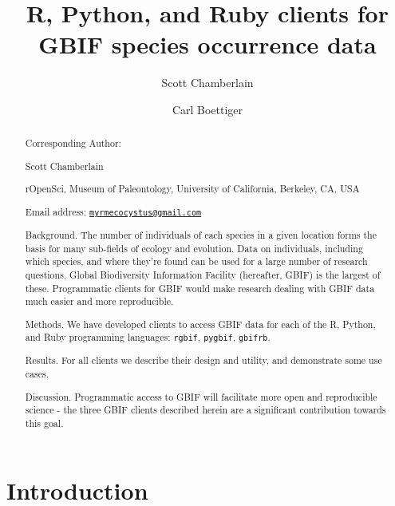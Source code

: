 \documentclass[3p]{elsarticle} %
\begin{document}
\begin{frontmatter}

  \title{R, Python, and Ruby clients for GBIF species occurrence data}
    \author[cstar]{Scott Chamberlain}
    \author[boettig]{Carl Boettiger}
      \address[cstar]{rOpenSci, Museum of Paleontology, University of
California, Berkeley, CA, USA}
    \address[boettig]{rOpenSci, Department of Enivornmental Science,
Policy and Management, University of California, Berkeley, CA, USA}
    
  \begin{abstract}
  Corresponding Author:

  Scott Chamberlain

  rOpenSci, Museum of Paleontology, University of California, Berkeley,
  CA, USA

  Email address:
  \href{mailto:myrmecocystus@gmail.com}{\nolinkurl{myrmecocystus@gmail.com}}

  \newpage

  Background. The number of individuals of each species in a given
  location forms the basis for many sub-fields of ecology and evolution.
  Data on individuals, including which species, and where they're found
  can be used for a large number of research questions. Global
  Biodiversity Information Facility (hereafter, GBIF) is the largest of
  these. Programmatic clients for GBIF would make research dealing with
  GBIF data much easier and more reproducible.

  Methods. We have developed clients to access GBIF data for each of the
  R, Python, and Ruby programming languages: \texttt{rgbif},
  \texttt{pygbif}, \texttt{gbifrb}.

  Results. For all clients we describe their design and utility, and
  demonstrate some use cases.

  Discussion. Programmatic access to GBIF will facilitate more open and
  reproducible science - the three GBIF clients described herein are a
  significant contribution towards this goal.
  \end{abstract}
  
 \end{frontmatter}

\newpage

\hypertarget{introduction}{%
\section{Introduction}\label{introduction}}
\end{document}
